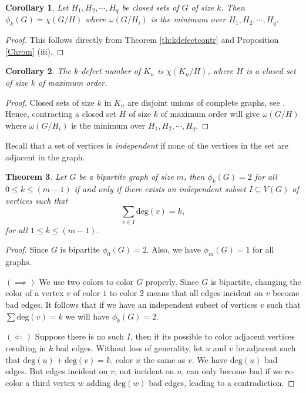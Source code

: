 \documentclass[12pt]{amsart}
\newtheorem{theorem}{Theorem}[section]
\newtheorem{corollary}[theorem]{Corollary}
\theoremstyle{definition}
\theoremstyle{remark}
\numberwithin{equation}{section}
\begin{document}
\begin{corollary}
Let $H_1, H_2, \cdots, H_q$ be closed sets of $G$ of size $k.$ Then $\phi_k(G)= \chi(G/H)$ where  $\omega (G/H_i)$ is the minimum  over $H_1, H_2, \cdots, H_q .$ 
\end{corollary}

\begin{proof}
	This follows directly from Theorem \ref{th:kdefectcontr} and Proposition \ref{Chrom} (iii).
\end{proof}

\begin{corollary}The $k$-defect number of $K_n$ is $\chi(K_n /H)$, where $H$ is a closed set of size $k$ of maximum order.
\end{corollary}
\begin{proof}
	Closed sets of size $k$ in $K_n$ are disjoint unions of complete graphs, see \cite{KM22}. Hence, contracting a closed set $H$ of size $k$ of maximum order will give $\omega(G/H)$ where $\omega (G/H_i)$ is the minimum  over $H_1, H_2, \cdots, H_q .$
\end{proof}

Recall that a set of vertices is \emph{independent} if none of the vertices in the set are adjacent in the graph.

\begin{theorem}
Let $G$ be a bipartite graph of size $m$, then $\phi_k(G)=2$ for all $0\leq k \leq (m-1)$ if and only if there exists an independent subset $I\subseteq V(G)$ of vertices such that
\[\sum_{v\in I} \textrm{deg}(v)=k,
\]
for all $1\leq k \leq (m-1).$
\label{th:k2iff}
\end{theorem}
\begin{proof}
Since $G$ is bipartite $\phi_0(G)=2$. Also, we have $\phi_m(G)=1$ for all graphs.

$(\implies)$ We use two colors to color $G$ properly. Since $G$ is bipartite, changing the color of a vertex $v$ of color $1$ to color $2$ means that all edges incident on $v$ become bad edges. It follows that if we have an independent subset of vertices $v$ such that $\sum \textrm{deg}(v)=k$ we will have $\phi_k(G)=2$.

$(\Longleftarrow)$ Suppose there is no such $I$, then it its possible to color adjacent vertices resulting in $k$ bad edges. Without loss of generality, let $u$ and $v$ be adjacent such that $\textrm{deg}(u)+\textrm{deg}(v)=k$. color $u$ the same as $v$. We have $\textrm{deg}(u)$ bad edges. But edges incident on $v$, not incident on $u$, can only become bad if we re-color a third vertex $w$ adding $\textrm{deg}(w)$ bad edges, leading to a contradiction.
\end{proof}
\end{document}
